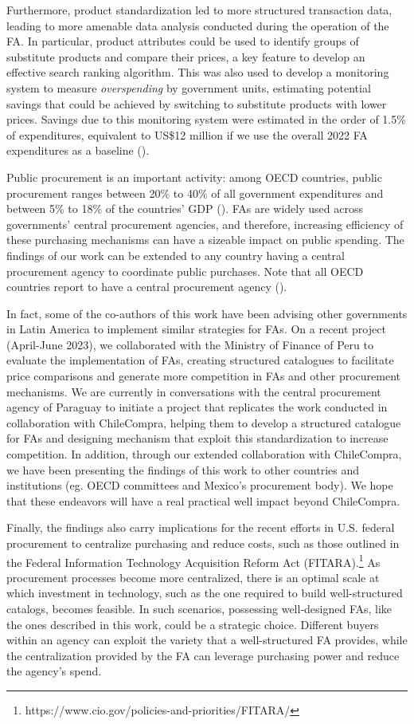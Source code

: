Furthermore, product standardization led to more structured transaction data, leading to more amenable data analysis conducted during the operation of the FA. In particular, product attributes could be used to identify groups of substitute products and compare their prices, {a key feature to develop an effective search ranking algorithm}. This was also used to develop a monitoring system to measure \textit{overspending} by government units, estimating potential savings that could be achieved by switching to substitute products with lower prices. Savings due to this monitoring system were estimated in the order of 1.5\% of expenditures, equivalent to  US\$12 million if we use the overall 2022 FA expenditures as a baseline (\cite{dipresFEI}).


Public procurement is an important activity: among OECD countries, public procurement ranges between 20\% to 40\% of all government expenditures and between 5\% to 18\% of the countries' GDP (\cite{OECD2017_PP}). FAs are widely used across governments' central procurement agencies, and therefore, increasing efficiency of these purchasing mechanisms can have a sizeable impact on public spending. The findings of our work can be extended to any country having a central procurement agency to coordinate public purchases. Note that all OECD countries report to have a central procurement agency (\cite{OECD2015_CPB}).

In fact, some of the co-authors of this work have been advising other governments in Latin America to implement similar strategies for FAs. On a recent project (April-June 2023), we collaborated with the Ministry of Finance of Peru to evaluate the implementation of FAs, creating structured catalogues to facilitate price comparisons and generate more competition in FAs and other procurement mechanisms. We are currently in conversations with the central procurement agency of Paraguay to initiate a project that replicates the work conducted in collaboration with ChileCompra, helping them to develop a structured catalogue for FAs and designing mechanism that exploit this standardization to increase competition. In addition, through our extended collaboration with ChileCompra, we have been presenting the findings of this work to other countries and institutions (eg. OECD committees and Mexico's procurement body). We hope that these endeavors will have a real practical well impact beyond ChileCompra.

Finally, the findings also carry implications for the recent efforts in U.S. federal procurement to centralize purchasing and reduce costs, such as those outlined in the Federal Information Technology Acquisition Reform Act (FITARA).\footnote{https://www.cio.gov/policies-and-priorities/FITARA/} As procurement processes become more centralized, there is an optimal scale at which investment in technology, such as the one required to build well-structured catalogs,  becomes feasible. In such scenarios, possessing well-designed FAs, like the ones described in this work, could be a strategic choice. Different buyers within an agency can exploit the variety that a well-structured FA provides, while the centralization provided by the FA can leverage purchasing power and reduce the agency's spend.

